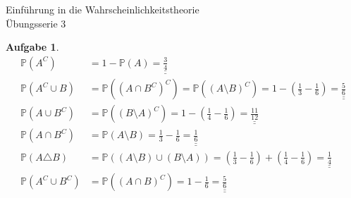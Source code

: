 \documentclass[11pt]{article}
\theoremstyle{break}
\newtheorem{task}{Aufgabe}
\begin{document}
\begin{center}
\Large{Einführung in die Wahrscheinlichkeitstheorie}\\
\large{Übungsserie 3}
\end{center}
\begin{task}
    \hfill\vspace{-5mm}
    \begin{align*}
        \mathbb{P}(A^C)             &= 1 - \mathbb{P}(A) = \underline{\underline{\frac{3}{4}}}\\
        \mathbb{P}(A^C\cup B)       &= \mathbb{P}((A\cap B^C)^C) = \mathbb{P}((A\setminus B)^C) = 1 - \left(\frac{1}{3} - \frac{1}{6}\right) = \underline{\underline{\frac{5}{6}}}\\
        \mathbb{P}(A\cup B^C)       &= \mathbb{P}((B\setminus A)^C) = 1 - \left(\frac{1}{4} - \frac{1}{6}\right) = \underline{\underline{\frac{11}{12}}}\\
        \mathbb{P}(A\cap B^C)       &= \mathbb{P}(A\setminus B) = \frac{1}{3} - \frac{1}{6} = \underline{\underline{\frac{1}{6}}}\\
        \mathbb{P}(A\triangle B)    &= \mathbb{P}((A\setminus B)\cup (B\setminus A)) = \left(\frac{1}{3} - \frac{1}{6}\right) + \left(\frac{1}{4} - \frac{1}{6}\right) = \underline{\underline{\frac{1}{4}}}\\
        \mathbb{P}(A^C\cup B^C)     &= \mathbb{P}((A\cap B)^C) = 1-\frac{1}{6} = \underline{\underline{\frac{5}{6}}}\\
    \end{align*}
\end{task}
\end{document}
